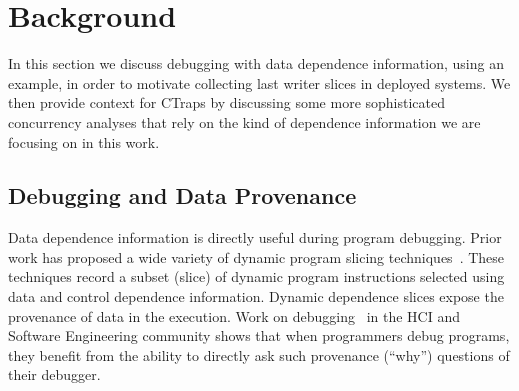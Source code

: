 \documentclass[preprint,9pt]{sigplanconf}
\newcommand{\ctraps}{CTraps\xspace}
\begin{document}


\section{Background}

In this section we discuss debugging with data dependence information, using an
example, in order to motivate collecting last writer slices in deployed
systems.  We then provide context for \ctraps by discussing some more
sophisticated concurrency analyses that rely on the kind of dependence
information we are focusing on in this work.


\subsection{Debugging and Data Provenance}

Data dependence information is directly useful during program debugging.  Prior
work has proposed a wide variety of dynamic program slicing
techniques~\cite{thinslicing,tipslicingsurvey}.  These techniques record a
subset (slice) of dynamic program instructions selected using data and control
dependence information.  Dynamic dependence slices expose the provenance of
data in the execution.  Work on debugging~\cite{whylinechi,whylineicse} in the
HCI and Software Engineering community shows that when programmers debug
programs, they benefit from the ability to directly ask such provenance
(``why'') questions of their debugger.  
\end{document}
